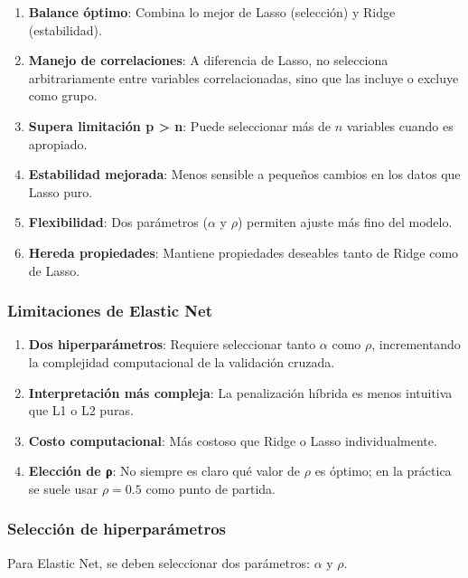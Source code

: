 \documentclass[
  doc,
  floatsintext,
  longtable,
  a4paper,
  nolmodern,
  notxfonts,
  notimes,
  12pt,
  colorlinks=true,linkcolor=blue,citecolor=blue,urlcolor=blue]{apa7}
\begin{document}
\begin{enumerate}
\def\labelenumi{\arabic{enumi}.}
\item
  \textbf{Balance óptimo}: Combina lo mejor de Lasso (selección) y Ridge
  (estabilidad).
\item
  \textbf{Manejo de correlaciones}: A diferencia de Lasso, no selecciona
  arbitrariamente entre variables correlacionadas, sino que las incluye
  o excluye como grupo.
\item
  \textbf{Supera limitación p \textgreater{} n}: Puede seleccionar más
  de \(n\) variables cuando es apropiado.
\item
  \textbf{Estabilidad mejorada}: Menos sensible a pequeños cambios en
  los datos que Lasso puro.
\item
  \textbf{Flexibilidad}: Dos parámetros (\(\alpha\) y \(\rho\)) permiten
  ajuste más fino del modelo.
\item
  \textbf{Hereda propiedades}: Mantiene propiedades deseables tanto de
  Ridge como de Lasso.
\end{enumerate}

\subsubsection{Limitaciones de Elastic
Net}\label{limitaciones-de-elastic-net}

\begin{enumerate}
\def\labelenumi{\arabic{enumi}.}
\item
  \textbf{Dos hiperparámetros}: Requiere seleccionar tanto \(\alpha\)
  como \(\rho\), incrementando la complejidad computacional de la
  validación cruzada.
\item
  \textbf{Interpretación más compleja}: La penalización híbrida es menos
  intuitiva que L1 o L2 puras.
\item
  \textbf{Costo computacional}: Más costoso que Ridge o Lasso
  individualmente.
\item
  \textbf{Elección de ρ}: No siempre es claro qué valor de \(\rho\) es
  óptimo; en la práctica se suele usar \(\rho = 0.5\) como punto de
  partida.
\end{enumerate}

\subsubsection{Selección de
hiperparámetros}\label{selecciuxf3n-de-hiperparuxe1metros}

Para Elastic Net, se deben seleccionar dos parámetros: \(\alpha\) y
\(\rho\).
\end{document}

